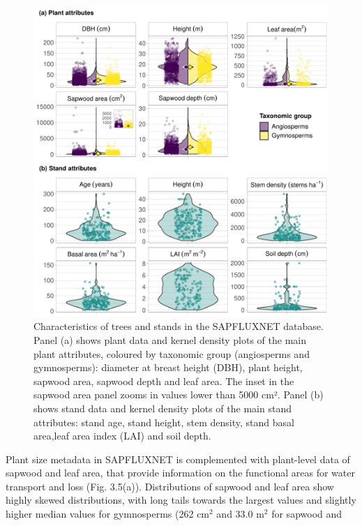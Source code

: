 \documentclass[11pt,twoside]{reedthesis}
\begin{document}
\setlength{\abovecaptionskip}{0pt}
\begin{figure}[hbt!]

{\centering \includegraphics[width=1\linewidth]{figure/CH3/Figure5} 

}

\caption[Characteristics of trees and stands in the SAPFLUXNET database.]{Characteristics of trees and stands in the SAPFLUXNET database. Panel (a) shows plant data and kernel density plots of the main plant attributes, coloured by taxonomic group (angiosperms and gymnosperms): diameter at breast height (DBH), plant height, sapwood area, sapwood depth and leaf area. The inset in the sapwood area panel zooms in values lower than 5000 cm². Panel (b) shows stand data and kernel density plots of the main stand attributes: stand age, stand height, stem density, stand basal area,leaf area index (LAI) and soil depth.}\label{fig:Ch2plot5}
\end{figure}
Plant size metadata in SAPFLUXNET is complemented with plant-level data
of sapwood and leaf area, that provide information on the functional
areas for water transport and loss (Fig. 3.5(a)). Distributions of
sapwood and leaf area show highly skewed distributions, with long tails
towards the largest values and slightly higher median values for
gymnosperms (262 \(\text{cm}^2\) and 33.0 \(\text{m}^2\) for sapwood and
\end{document}
